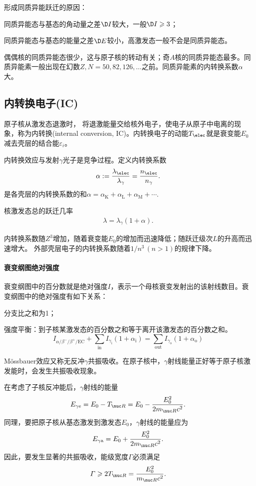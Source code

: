 形成同质异能跃迁的原因：
\begin{compactenum}
	\item 同质异能态与基态的角动量之差$\D I$较大，一般$\D I\geqslant 3$；
	\item 同质异能态与基态的能量之差$\D E$较小，高激发态一般不会是同质异能态。
\end{compactenum}
偶偶核的同质异能态很少，这与原子核的转动有关；奇$A$核的同质异能态最多。同质异能素一般出现在幻数$Z,N=50,82,126,\ldots$之前。同质异能素的内转换系数$\alpha$大。

\subsection{内转换电子(IC)}

原子核从激发态退激时，%
将退激能量交给核外电子，使电子从原子中电离的现象，称为内转换(internal conversion, IC)。内转换电子的动能$T_\elec$就是衰变能$E_0$减去壳层的结合能$\varepsilon_i$。

内转换效应与发射$\gamma$光子是竞争过程。定义内转换系数
\begin{align}
	\alpha:=\frac{\lambda_\elec}{\lambda_\gamma}=\frac{n_\elec}{n_\gamma}.
\end{align}
是各壳层的内转换系数的和$\alpha=\alpha_\mathrm K+\alpha_\mathrm L+\alpha_\mathrm M+\cdots.$

核激发态总的跃迁几率
\begin{align}
	\lambda=\lambda_\gamma(1+\alpha).
\end{align}

内转换系数随$Z^3$增加，随着衰变能$E_0$的增加而迅速降低；随跃迁级次$L$的升高而迅速增大。
外部壳层电子的内转换系数随着$1/n^3\,(n>1)$的规律下降。
\paragraph{衰变纲图绝对强度}衰变纲图中的百分数就是绝对强度$I$，表示一个母核衰变发射出的该射线数目。衰变纲图中的绝对强度有如下关系：
\begin{compactenum}
	\item 分支比之和为1；
	\item 强度平衡：到子核某激发态的百分数之和等于离开该激发态的百分数之和。
	\[
		I_{\alpha/\beta^-/\beta^+/\mathrm{EC}}+\sum_{\mathrm{in}} I_{\gamma_\mathrm i}(1+\alpha_\mathrm i)=\sum_{\mathrm{out}} I_{\gamma_\mathrm o}(1+\alpha_\mathrm o)
	\]
\end{compactenum}

\label{Mossbauer}

Mössbauer效应又称无反冲$\gamma$共振吸收。在原子核中，$\gamma$射线能量正好等于原子核激发能时，会发生共振吸收现象。

在考虑了子核反冲能后，$\gamma$射线的能量
\[
	E_{\gamma\mathrm e}=E_0-T_{\nuc R}=E_0-\frac{E_0^2}{2m_{\nuc R}c^2}.
\]
同理，要把原子核从基态激发到激发态$E_0$，$\gamma$射线的能量应为
\[
	E_{\gamma\mathrm a}=E_0+\frac{E_0^2}{2m_{\nuc R}c^2}.
\]
因此，要发生显著的共振吸收，能级宽度$\varGamma$必须满足
\begin{align}
	\varGamma\geqslant 2T_{\nuc R}=\frac{E_0^2}{m_{\nuc R}c^2}.
\end{align}

